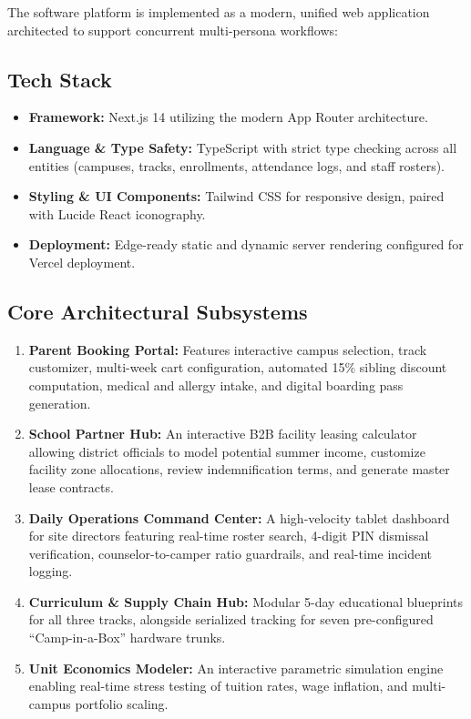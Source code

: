 \documentclass[11pt,a4paper]{article}
\begin{document}
The software platform is implemented as a modern, unified web application architected to support concurrent multi-persona workflows:

\subsection{Tech Stack}
\begin{itemize}
    \item \textbf{Framework:} Next.js 14 utilizing the modern App Router architecture.
    \item \textbf{Language \& Type Safety:} TypeScript with strict type checking across all entities (campuses, tracks, enrollments, attendance logs, and staff rosters).
    \item \textbf{Styling \& UI Components:} Tailwind CSS for responsive design, paired with Lucide React iconography.
    \item \textbf{Deployment:} Edge-ready static and dynamic server rendering configured for Vercel deployment.
\end{itemize}

\subsection{Core Architectural Subsystems}
\begin{enumerate}
    \item \textbf{Parent Booking Portal:} Features interactive campus selection, track customizer, multi-week cart configuration, automated 15\% sibling discount computation, medical and allergy intake, and digital boarding pass generation.
    \item \textbf{School Partner Hub:} An interactive B2B facility leasing calculator allowing district officials to model potential summer income, customize facility zone allocations, review indemnification terms, and generate master lease contracts.
    \item \textbf{Daily Operations Command Center:} A high-velocity tablet dashboard for site directors featuring real-time roster search, 4-digit PIN dismissal verification, counselor-to-camper ratio guardrails, and real-time incident logging.
    \item \textbf{Curriculum \& Supply Chain Hub:} Modular 5-day educational blueprints for all three tracks, alongside serialized tracking for seven pre-configured ``Camp-in-a-Box'' hardware trunks.
    \item \textbf{Unit Economics Modeler:} An interactive parametric simulation engine enabling real-time stress testing of tuition rates, wage inflation, and multi-campus portfolio scaling.
\end{enumerate}
\end{document}
